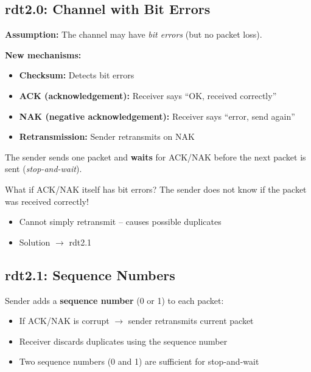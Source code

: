 \subsection{rdt2.0: Channel with Bit Errors}

\begin{keybox}
\textbf{Assumption:} The channel may have \emph{bit errors} (but no packet loss).

\textbf{New mechanisms:}
\begin{itemize}[noitemsep]
    \item \textbf{Checksum:} Detects bit errors
    \item \textbf{ACK (acknowledgement):} Receiver says ``OK, received correctly''
    \item \textbf{NAK (negative acknowledgement):} Receiver says ``error, send again''
    \item \textbf{Retransmission:} Sender retransmits on NAK
\end{itemize}
The sender sends one packet and \textbf{waits} for ACK/NAK before the next packet is sent (\emph{stop-and-wait}).
\end{keybox}

\begin{warnbox}
What if ACK/NAK itself has bit errors? The sender does not know if the packet was received correctly!
\begin{itemize}[noitemsep]
    \item Cannot simply retransmit -- causes possible duplicates
    \item Solution $\rightarrow$ rdt2.1
\end{itemize}
\end{warnbox}

\subsection{rdt2.1: Sequence Numbers}

\begin{keybox}
Sender adds a \textbf{sequence number} (0 or 1) to each packet:
\begin{itemize}[noitemsep]
    \item If ACK/NAK is corrupt $\rightarrow$ sender retransmits current packet
    \item Receiver discards duplicates using the sequence number
    \item Two sequence numbers (0 and 1) are sufficient for stop-and-wait
\end{itemize}
\end{keybox}

